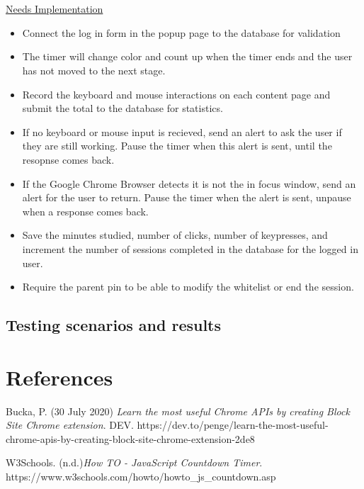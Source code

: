 \documentclass[12pt]{article}
\begin{document}
\\\\\noindent
\underline{Needs Implementation}\\
\begin{itemize}
    \item Connect the log in form in the popup page to the database for validation
    \item The timer will change color and count up when the timer ends and the user has not moved to the next stage.
    \item Record the keyboard and mouse interactions on each content page and submit the total to the database for statistics.
    \item If no keyboard or mouse input is recieved, send an alert to ask the user if they are still working. Pause the timer when this alert is sent, until the resopnse comes back.
    \item If the Google Chrome Browser detects it is not the in focus window, send an alert for the user to return. Pause the timer when the alert is sent, unpause when a response comes back.
    \item Save the minutes studied, number of clicks, number of keypresses, and increment the number of sessions completed in the database for the logged in user.
    \item Require the parent pin to be able to modify the whitelist or end the session.
\end{itemize}

\subsection{Testing scenarios and results}

\section{References}

\begingroup
\renewcommand{\section}[2]{}
\begin{thebibliography}{10}
    Bucka, P. (30 July 2020) \textit{Learn the most useful Chrome APIs by creating Block Site Chrome extension}.
    DEV. https://dev.to/penge/learn-the-most-useful-chrome-apis-by-creating-block-site-chrome-extension-2de8

    W3Schools. (n.d.)\textit{How TO - JavaScript Countdown Timer}. https://www.w3schools.com/howto/howto_js_countdown.asp

    \bigskip
\end{thebibliography}
\endgroup
\end{document}
